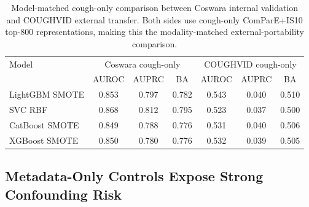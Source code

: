 \documentclass[preprint,12pt]{elsarticle}
\begin{document}
\begin{table}[t]
\centering
\caption{Model-matched cough-only comparison between Coswara internal validation and COUGHVID external transfer. Both sides use cough-only ComParE+IS10 top-800 representations, making this the modality-matched external-portability comparison.}
\label{tab:cough_matched_transfer}
\small
\begin{tabular}{lcccccc}
\toprule
Model & \multicolumn{3}{c}{Coswara cough-only} & \multicolumn{3}{c}{COUGHVID cough-only} \\
\cmidrule(lr){2-4}\cmidrule(lr){5-7}
 & AUROC & AUPRC & BA & AUROC & AUPRC & BA \\
\midrule
LightGBM SMOTE & 0.853 & 0.797 & 0.782 & 0.543 & 0.040 & 0.510 \\
SVC RBF & 0.868 & 0.812 & 0.795 & 0.523 & 0.037 & 0.500 \\
CatBoost SMOTE & 0.849 & 0.788 & 0.776 & 0.531 & 0.040 & 0.506 \\
XGBoost SMOTE & 0.850 & 0.780 & 0.776 & 0.532 & 0.039 & 0.505 \\
\bottomrule
\end{tabular}
\end{table}

\begin{table}[t]
\centering
\caption{Fixed cough-only model-family ladder across validation tiers. Each row keeps the modality fixed to cough and follows the same model family across protocols. Models are retrained within the corresponding source-domain protocol; values are AUROC.}
\label{tab:fixed_cough_ladder}
\small
{}
\end{table}

\subsection{Metadata-Only Controls Expose Strong Confounding Risk}
\end{document}
